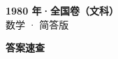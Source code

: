 \documentclass[zihao=-4, a4paper]{ctexart}
\begin{document}
\begin{center}
  {\Large\bfseries 1980 年·全国卷（文科）}\\[4pt]
  {\large 数学 · 简答版}
\end{center}
\medskip
{}

\clearpage
{}
\begin{center}{\Large\bfseries 答案速查}\end{center}
\medskip

\end{document}
